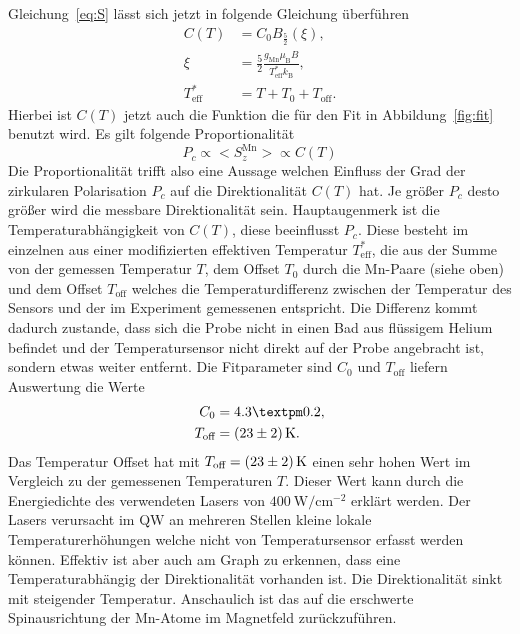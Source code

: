 Gleichung~\ref{eq:S} lässt sich jetzt in folgende Gleichung überführen
\begin{align}
    C(T)&= C_0 B_\text{$\frac{5}{2}$} (\xi)\text{,} \\
    \xi &= \frac{5}{2}\frac{g_\text{Mn} \mu_\text{B} B }{T^*_\text{eff} k_\text{B}}\text{,} \\
    T^*_\text{eff} &= T + T_0 + T_\text{off}\text{.}
\end{align}
Hierbei ist $C(T)$ jetzt auch die Funktion die für den Fit in Abbildung~\ref{fig:fit} benutzt wird.
Es gilt folgende Proportionalität
\begin{equation}
    P_{c} \propto \bigl< S^\text{Mn}_{z} \bigr> \propto C(T)
\end{equation}
Die Proportionalität trifft also eine Aussage welchen Einfluss der Grad der zirkularen Polarisation $P_{c}$
auf die Direktionalität $C(T)$ hat. 
Je größer $P_{c}$ desto größer wird die messbare Direktionalität sein. 
Hauptaugenmerk ist die Temperaturabhängigkeit von $C(T)$, diese beeinflusst $P_{c}$.
Diese besteht im einzelnen aus 
einer modifizierten effektiven Temperatur $T^*_\text{eff}$, die aus der Summe von der gemessen Temperatur $T$, dem 
Offset $T_0$ durch die Mn-Paare (siehe oben)  und dem Offset $T_\text{off}$ welches
die Temperaturdifferenz zwischen der Temperatur des Sensors und der im Experiment gemessenen entspricht. 
Die Differenz kommt dadurch zustande, dass sich die Probe nicht in einen Bad aus flüssigem Helium befindet
und der Temperatursensor nicht direkt auf der Probe angebracht ist, sondern etwas weiter entfernt. 
Die Fitparameter sind $C_0$ und $T_\text{off}$ liefern Auswertung die Werte 
\begin{align}
    C_0 & = 4.3 ± 0.2, \\
    T_\text{off} & = \SI{ 23 \pm 2}{\kelvin}. 
\end{align}
Das Temperatur Offset hat mit $T_\text{off} = \SI{ 23 \pm 2}{\kelvin}$ einen sehr hohen Wert
im Vergleich zu der gemessenen Temperaturen $T$.
Dieser Wert kann durch die Energiedichte des verwendeten Lasers von $\SI{400}{\watt\per\centi\meter^{-2}}$
erklärt werden.
Der Lasers verursacht im QW an mehreren Stellen kleine lokale Temperaturerhöhungen welche nicht 
von Temperatursensor erfasst werden können.
Effektiv ist aber auch am Graph zu erkennen, dass eine Temperaturabhängig der Direktionalität
vorhanden ist.
Die Direktionalität sinkt mit steigender Temperatur.
Anschaulich ist das auf die erschwerte Spinausrichtung der Mn-Atome im Magnetfeld zurückzuführen.

